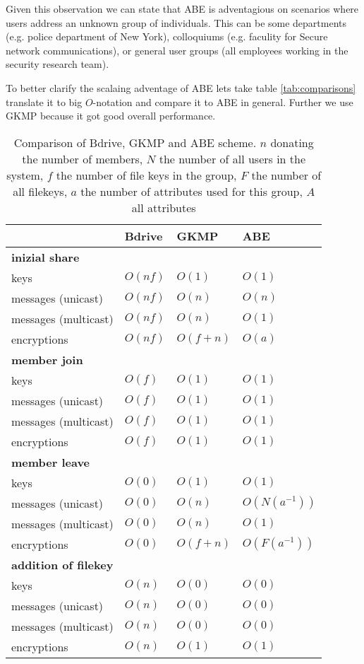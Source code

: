 Given this observation we can state that \ac{ABE} is adventagious on scenarios where users address an unknown group of individuals. This can be some departments (e.g. police department of New York), colloquiums (e.g. faculity for Secure network communications), or general user groups (all employees working in the security research team).

To better clarify the scalaing adventage of \ac{ABE} lets take table \ref{tab:comparisons} translate it to big $O$-notation and compare it to \ac{ABE} in general. Further we use \ac{GKMP} because it got good overall performance.

\begin{table*}[!ht]
\centering
\begin{tabular}{l 		| l 						| l 						| l }
 						& \textbf{Bdrive}			& \textbf{\ac{GKMP}} 			& \textbf{\ac{ABE}} 		\\
\hline
\textbf{inizial share} 																				\\
keys 					& $O(nf)$ 					& $O(1)$	 				& $O(1)$			\\
messages (unicast)		& $O(nf)$  					& $O(n)$					& $O(n)$			\\
messages (multicast) 	& $O(nf)$ 					& $O(n)$ 					& $O(1)$			\\
encryptions				& $O(nf)$ 					& $O(f + n)$				& $O(a)$ 			\\
\hline
\textbf{member join} 																				\\
keys 					& $O(f)$   					& $O(1)$					& $O(1)$			\\
messages (unicast)		& $O(f)$  					& $O(1)$  					& $O(1)$ 			\\
messages (multicast) 	& $O(f)$ 	 				& $O(1)$					& $O(1)$ 			\\
encryptions				& $O(f)$  					& $O(1)$					& $O(1)$ 			\\
\hline
\textbf{member leave}																				\\
keys 					& $O(0)$					& $O(1)$					& $O(1)$			\\
messages (unicast)		& $O(0)$					& $O(n)$  					& $O(N(a^{-1}))$	\\
messages (multicast)	& $O(0)$					& $O(n)$					& $O(1)$ 			\\ 
encryptions 			& $O(0)$					& $O(f + n)$ 				& $O(F(a^{-1}))$	\\
\hline	
\textbf{addition of filekey}																		\\
keys 					& $O(n)$	 				& $O(0)$					& $O(0)$			\\
messages (unicast)		& $O(n)$	 				& $O(0)$					& $O(0)$			\\
messages (multicast)	& $O(n)$ 					& $O(0)$ 					& $O(0)$			\\
encryptions				& $O(n)$ 					& $O(1)$					& $O(1)$			\\
\hline
\end{tabular}
\caption{Comparison of Bdrive, \ac{GKMP} and \ac{ABE} scheme. $n$ donating the number of members, $N$ the number of all users in the system, $f$ the number of file keys in the group, $F$ the number of all filekeys, $a$ the number of attributes used for this group, $A$ all attributes }
\label{tab:comparisonsOWFTtoABE}
\end{table*}

